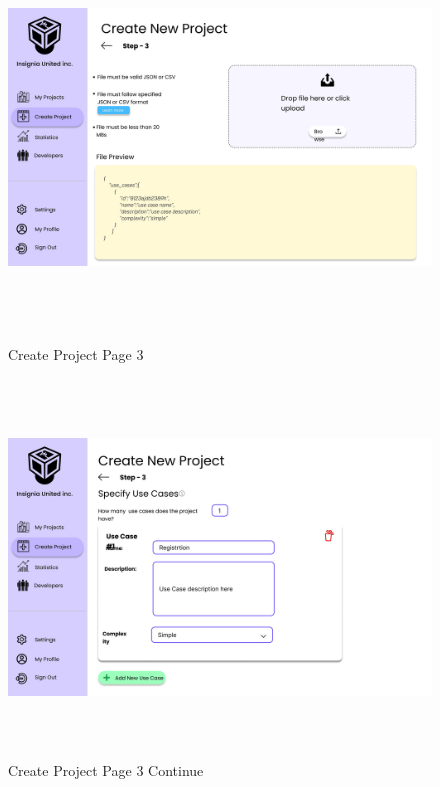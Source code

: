 \begin{figure}[H]
\includegraphics[height=10cm, width=1\textwidth]{./images/prototype/0014}
\centering 
\caption{Create Project Page 3}
\label{fig:prototype1}


\includegraphics[height=10cm, width=1\textwidth]{./images/prototype/0017}
\centering 
\caption{Create Project Page 3 Continue}
\label{fig:prototype1}
\end{figure}

